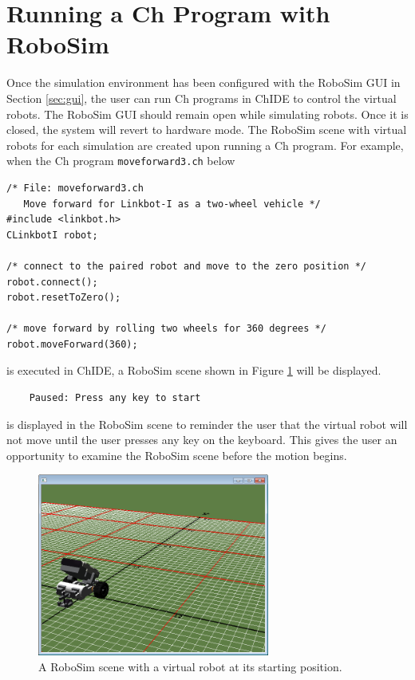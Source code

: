 \documentclass{article}
\begin{document}
\section{Running a Ch Program with RoboSim}
Once the simulation environment has been configured with the RoboSim GUI in
Section \ref{sec:gui}, the user can run Ch programs in ChIDE to control the
virtual robots.  The RoboSim GUI should remain open while simulating robots.
Once it is closed, the system will revert to hardware mode.  The RoboSim scene
with virtual robots for each simulation are created upon running a Ch program.
For example, when the Ch program {\tt moveforward3.ch} below
\begin{verbatim}
/* File: moveforward3.ch
   Move forward for Linkbot-I as a two-wheel vehicle */
#include <linkbot.h>
CLinkbotI robot;

/* connect to the paired robot and move to the zero position */
robot.connect();
robot.resetToZero();

/* move forward by rolling two wheels for 360 degrees */
robot.moveForward(360);
\end{verbatim}
\noindent
is executed in ChIDE, a RoboSim scene shown in Figure \ref{fig:robosim_scene}
will be displayed.
\begin{verbatim}
    Paused: Press any key to start
\end{verbatim}
is displayed in the RoboSim scene to reminder the user that the virtual robot
will not move until the user presses any key on the keyboard. This gives the
user an opportunity to examine the RoboSim scene before the motion begins.
\begin{figure}[H]
	\begin{center}
		\includegraphics[width=3in]{pictures/robosim_scene}
	\end{center}
	\caption{A RoboSim scene with a virtual robot at its starting position.}
	\label{fig:robosim_scene}
\end{figure}
\end{document}
